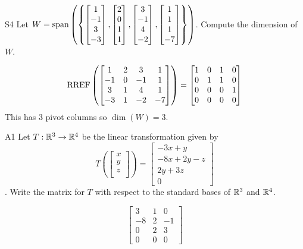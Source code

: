 \documentclass{sbgLAquiz}
\begin{document}
\begin{extract}\newpage\end{extract}
\begin{problem}{S4}  
Let $W={\rm span}\left( \left\{ \begin{bmatrix} 1 \\ -1 \\ 3 \\ -3 \end{bmatrix},\begin{bmatrix} 2 \\ 0 \\ 1 \\ 1 \end{bmatrix}, \begin{bmatrix} 3 \\ -1 \\ 4 \\ -2 \end{bmatrix},  \begin{bmatrix} 1 \\ 1 \\ 1 \\ -7 \end{bmatrix} \right\}\right)$.  Compute the dimension of $W$.
\end{problem}
\begin{solution}
$$ \operatorname{RREF} \left( \begin{bmatrix} 1 & 2 & 3 & 1 \\ -1 & 0 & -1 & 1 \\ 3 & 1 & 4 & 1 \\ -3 & 1 & -2 & -7 \end{bmatrix} \right) =  \begin{bmatrix} 1 & 0 & 1 & 0 \\ 0 & 1 & 1 & 0 \\ 0 & 0 & 0 & 1 \\ 0 & 0 & 0 & 0\end{bmatrix}$$
This has 3 pivot columns so $\dim(W)=3$.
\end{solution}


\begin{problem}{A1}
Let $T: \mathbb{R}^3\rightarrow \mathbb{R}^4$ be the linear transformation given by $$T\left(\begin{bmatrix} x \\ y \\ z \\  \end{bmatrix} \right) = \begin{bmatrix} -3x+y \\ -8x+2y-z \\ 2y+3z \\ 0 \end{bmatrix}$$.  Write the matrix for $T$ with respect to the standard bases of $\mathbb{R}^3$ and $\mathbb{R}^4$.
\end{problem}
\begin{solution}
$$\begin{bmatrix} 3 & 1 & 0 \\ -8 & 2 & -1 \\ 0 & 2 & 3 \\ 0 & 0 & 0 \end{bmatrix}$$
\end{solution}
\end{document}
